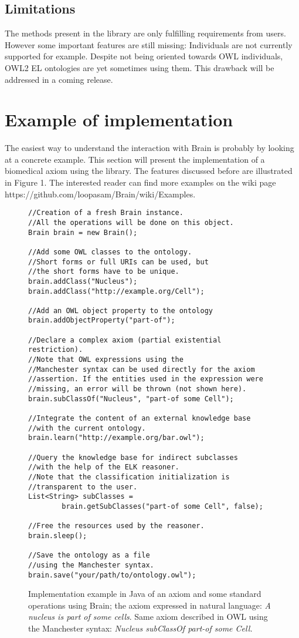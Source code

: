 \documentclass{llncs}
\begin{document}
\subsection{Limitations}
The methods present in the library are only fulfilling requirements from users. However some important 
features are still missing: Individuals are not currently supported for example. Despite not being oriented towards OWL individuals, OWL2 EL
ontologies are yet sometimes using them. This drawback will be addressed in a coming release.

\section{Example of implementation}

The easiest way to understand the interaction with Brain is probably by looking at a concrete example. 
This section will present the implementation
of a biomedical axiom using the library. The features discussed before are illustrated in Figure 1.
The interested reader can find more examples on the wiki page https://github.com/loopasam/Brain/wiki/Examples.

\begin{figure}[h]
\begingroup
\fontsize{10pt}{9pt}\selectfont
\begin{Verbatim}[frame=single]
//Creation of a fresh Brain instance.
//All the operations will be done on this object.
Brain brain = new Brain();

//Add some OWL classes to the ontology.
//Short forms or full URIs can be used, but 
//the short forms have to be unique.
brain.addClass("Nucleus");
brain.addClass("http://example.org/Cell");

//Add an OWL object property to the ontology
brain.addObjectProperty("part-of");

//Declare a complex axiom (partial existential restriction).
//Note that OWL expressions using the 
//Manchester syntax can be used directly for the axiom
//assertion. If the entities used in the expression were
//missing, an error will be thrown (not shown here).
brain.subClassOf("Nucleus", "part-of some Cell");

//Integrate the content of an external knowledge base
//with the current ontology.
brain.learn("http://example.org/bar.owl");

//Query the knowledge base for indirect subclasses
//with the help of the ELK reasoner.
//Note that the classification initialization is
//transparent to the user.
List<String> subClasses = 
		brain.getSubClasses("part-of some Cell", false);

//Free the resources used by the reasoner.
brain.sleep();

//Save the ontology as a file
//using the Manchester syntax.
brain.save("your/path/to/ontology.owl");
\end{Verbatim}
\endgroup
\caption{Implementation example in Java of an axiom and some standard operations using Brain; the axiom expressed in natural language:
 \textit{A nucleus is part of some cells}. Same axiom described in OWL using the Manchester syntax: 
 \textit{Nucleus subClassOf part-of some Cell.}}
\end{figure}
\end{document}
